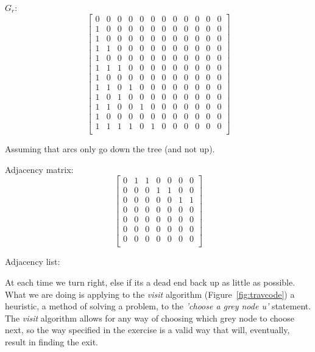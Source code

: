 \(G_r:\)
\[\left[
	\begin{array}{cccccccccccc}
	0&0&0&0&0&0&0&0&0&0&0&0 \\
	1&0&0&0&0&0&0&0&0&0&0&0 \\
	1&0&0&0&0&0&0&0&0&0&0&0 \\
	1&1&0&0&0&0&0&0&0&0&0&0 \\
	1&0&0&0&0&0&0&0&0&0&0&0 \\
	1&1&1&0&0&0&0&0&0&0&0&0 \\
	1&0&0&0&0&0&0&0&0&0&0&0 \\
	1&1&0&1&0&0&0&0&0&0&0&0 \\
	1&0&1&0&0&0&0&0&0&0&0&0 \\
	1&1&0&0&1&0&0&0&0&0&0&0 \\
	1&0&0&0&0&0&0&0&0&0&0&0 \\
	1&1&1&1&0&1&0&0&0&0&0&0 \\
	\end{array}
\right]\]


Assuming that arcs only go down the tree (and not up).

Adjacency matrix:
\[\left[
	\begin{array}{ccccccc}
	0& 1& 1& 0& 0& 0& 0 \\
	0& 0& 0& 1& 1& 0& 0 \\
	0& 0& 0& 0& 0& 1& 1 \\
	0& 0& 0& 0& 0& 0& 0 \\
	0& 0& 0& 0& 0& 0& 0 \\
	0& 0& 0& 0& 0& 0& 0 \\
	0& 0& 0& 0& 0& 0& 0 \\
	\end{array}
\right]\]

Adjacency list:
\fi


At each time we turn right, else if its a dead end back up as little
as possible. What we are doing is applying to the \emph{visit}
algorithm (Figure~\ref{fig:travcode}) a heuristic, a method of solving 
a problem,    
to the \emph{'choose a grey node \emph{u}'} statement. The \emph{visit}
algorithm allows for any way of choosing which grey node to choose
next, so the way specified in the exercise is a valid way that will,     
eventually, result in finding the exit.


